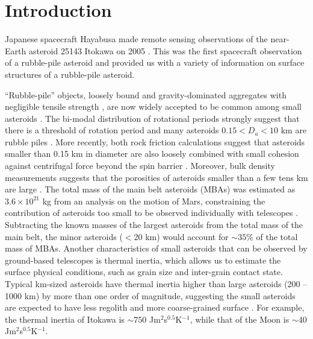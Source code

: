 \documentclass[3p,authoryear]{elsarticle}
\begin{document}
\tableofcontents
\linenumbers

\section{Introduction}\label{sec:intro}

Japanese spacecraft Hayabusa made remote sensing observations of the near-Earth asteroid 25143 Itokawa on 2005 \citep{fujiwara2006, saito2006}. 
This was the first spacecraft observation of a rubble-pile asteroid and provided us with a variety of information on surface structures of a rubble-pile asteroid.

``Rubble-pile'' objects,  loosely bound and gravity-dominated aggregates with negligible tensile strength \citep[e.g.][]{fujiwara1980}, are now
widely accepted to be common among small asteroids \citep[e.g.][]{richardson2002}. The bi-modal distribution of rotational periods strongly suggest
that there is a threshold of rotation period and many asteroids $0.15<D_a<10$ km are rubble piles \citep{pravec2002}. More recently, both rock
friction calculations suggest that asteroids smaller than 0.15 km in diameter are also loosely combined with small cohesion against
centrifugal force beyond the spin barrier \citep[e.g.][]{holsapple2007,scheeres2010,rozitis2014}. Moreover, bulk density measurements suggests that the porosities of asteroids smaller
than a few tens km are large \citep{britt2002}. The total mass of the main belt asteroids (MBAs) was estimated as $3.6\times 10^{21}$ kg from an
analysis on the motion of Mars, constraining the contribution of asteroids too small to be observed individually with telescopes \citep{krasinsky2002}.
Subtracting the known masses of the largest asteroids \citep{demeo2014} from the total mass of the main belt, the minor asteroids ($<$20 km) would account for $\sim 35 \%$ of the total mass of MBAs. Another characteristics of small asteroids that can be observed by ground-based telescopes is thermal
inertia, which allows us to estimate the surface physical conditions, such as grain size and inter-grain contact state. Typical km-sized asteroids
have thermal inertia higher than large asteroids (200 -- 1000 km) by more than one order of magnitude, suggesting the small asteroids are
expected to have less regolith and more coarse-grained surface \citep{delbo2009}. For example, the thermal inertia of Itokawa is $\sim 750$ Jm$^2$s$^{0.5}$K$^{-1}$\citep{muller2005}, while that of the Moon is $\sim 40$ Jm$^2$s$^{0.5}$K$^{-1}$\citep{Keihm1984}.
\end{document}
